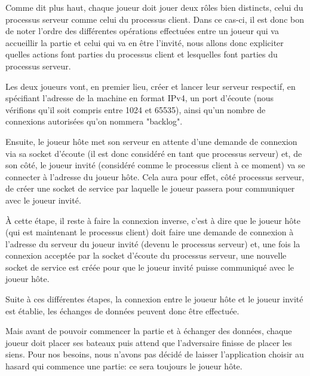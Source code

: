 			Comme dit plus haut, chaque joueur doit jouer deux rôles bien distincts, celui du processus serveur comme celui du processus client. Dans ce cas-ci, il est donc bon de noter l'ordre des différentes opérations effectuées entre un joueur qui va accueillir la partie et celui qui va en être l'invité, nous allons donc expliciter quelles actions font parties du processus client et lesquelles font parties du processus serveur. \newline			
			
			Les deux joueurs vont, en premier lieu, créer et lancer leur serveur respectif, en spécifiant l'adresse de la machine en format IPv4, un port d'écoute (nous vérifions qu'il soit compris entre 1024 et 65535), ainsi qu'un nombre de connexions autorisées qu'on nommera "backlog". \newline
			
			Ensuite, le joueur hôte met son serveur en attente d'une demande de connexion via sa socket d'écoute (il est donc considéré en tant que processus serveur) et, de son côté, le joueur invité (considéré comme le processus client à ce moment) va se connecter à l'adresse du joueur hôte. Cela aura pour effet, côté processus serveur, de créer une socket de service par laquelle le joueur passera pour communiquer avec le joueur invité. \newline
			
			À cette étape, il reste à faire la connexion inverse, c'est à dire que le joueur hôte (qui est maintenant le processus client) doit faire une demande de connexion à l'adresse du serveur du joueur invité (devenu le processus serveur) et, une fois la connexion acceptée par la socket d'écoute du processus serveur, une nouvelle socket de service est créée pour que le joueur invité puisse communiqué avec le joueur hôte.\newline
			
			Suite à ces différentes étapes, la connexion entre le joueur hôte et le joueur invité est établie, les échanges de données peuvent donc être effectuée.

			Mais avant de pouvoir commencer la partie et à échanger des données, chaque joueur doit placer ses bateaux puis attend que l'adversaire finisse de placer les siens. Pour nos besoins, nous n'avons pas décidé de laisser l'application choisir au hasard qui commence une partie: ce sera toujours le joueur hôte. \newline
			
